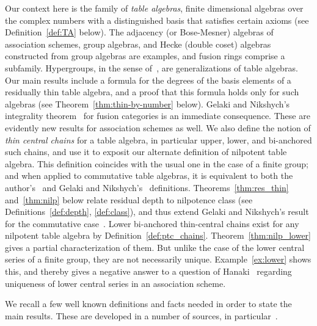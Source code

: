 \documentclass[ALCO,ThmDefs,Unicode,epreuves]{cedram}
\begin{document}
Our context here is the family of \emph{table algebras}, finite
dimensional algebras over the complex numbers with a distinguished basis
that satisfies certain axioms (see Definition~\ref{def:TA} below). The
adjacency (or Bose-Mesner) algebras of association schemes, group
algebras, and Hecke (double coset) algebras constructed from group
algebras are examples, and fusion rings comprise a subfamily.
Hypergroups, in the sense of~\cite{FZ}, are generalizations of table
algebras. Our main results include a formula for the degrees of the
basis elements of a residually thin table algebra, and a proof that this
formula holds only for such algebras (see Theorem~\ref{thm:thin-by-number} 
below). Gelaki and Nikshych's integrality theorem~\cite [Corollary~5.3]{GN} for fusion categories is an immediate consequence. These are evidently new results
for association schemes as well. We also define the notion of
\emph{thin central chains} for a table algebra, in particular upper,
lower, and bi-anchored such chains, and use it to exposit our alternate
definition of nilpotent table algebra. This definition coincides with the usual one
in the case of a finite group; and when applied to commutative table
algebras, it is equivalent to both the author's~\cite{Blau1} and Gelaki
and Nikshych's~\cite{GN} definitions. Theorems~\ref{thm:res_thin} and~\ref{thm:nilp} 
below relate residual depth to nilpotence class (see Definitions~\ref{def:depth}, \ref{def:class}), 
and thus extend 
Gelaki and
Nikshych's result for the commutative case~\cite [Theorem~4.16]{GN}.
Lower bi-anchored thin-central chains exist for any nilpotent table
algebra by Definition~\ref{def:ptc_chains}. Theorem~\ref{thm:nilp_lower} gives a partial characterization of them. But
unlike the case of the lower central series of a finite group, they are
not necessarily unique. Example~\ref{ex:lower} shows this, and thereby
gives a negative answer to a question of Hanaki~\cite [Question~2.11]{H} regarding uniqueness of lower central series in an association
scheme.
 

We recall a few well known definitions and facts needed in order to
state the main results. These are developed in a number of sources, in
particular~\cite{AFM, BZ,Blau2}.
\end{document}
